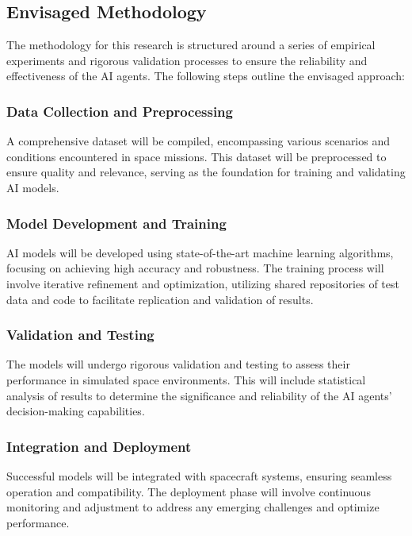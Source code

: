 \documentclass[a4paper, 11pt]{article}
\begin{document}
\subsection{Envisaged Methodology}

The methodology for this research is structured around a series of empirical experiments and rigorous validation processes to ensure the reliability and effectiveness of the AI agents. The following steps outline the envisaged approach:

\subsubsection{Data Collection and Preprocessing}

A comprehensive dataset will be compiled, encompassing various scenarios and conditions encountered in space missions. This dataset will be preprocessed to ensure quality and relevance, serving as the foundation for training and validating AI models.

\subsubsection{Model Development and Training}

AI models will be developed using state-of-the-art machine learning algorithms, focusing on achieving high accuracy and robustness. The training process will involve iterative refinement and optimization, utilizing shared repositories of test data and code to facilitate replication and validation of results.

\subsubsection{Validation and Testing}

The models will undergo rigorous validation and testing to assess their performance in simulated space environments. This will include statistical analysis of results to determine the significance and reliability of the AI agents' decision-making capabilities.

\subsubsection{Integration and Deployment}

Successful models will be integrated with spacecraft systems, ensuring seamless operation and compatibility. The deployment phase will involve continuous monitoring and adjustment to address any emerging challenges and optimize performance.
\end{document}
